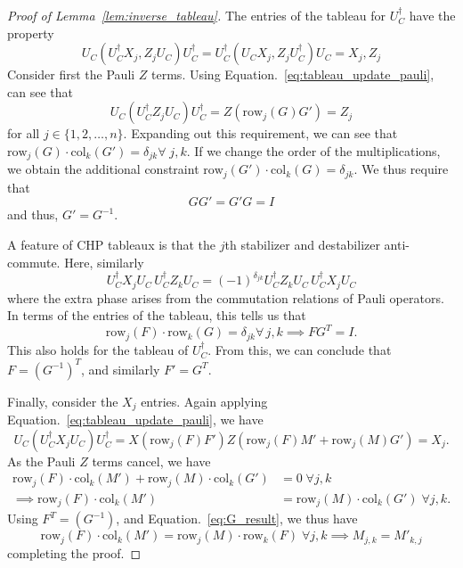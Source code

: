 \begin{proof}[Proof of Lemma~\ref{lem:inverse_tableau}]
The entries of the tableau for $U_{C}^{\dagger}$ have the property
\[
U_{C}\left(U_{C}^{\dagger}X_{j},Z_{j}U_{C}\right)U_{C}^{\dagger} = U_{C}^{\dagger}\left(U_{C}X_{j},Z_{j}U_{C}^{\dagger}\right)U_{C}=X_{j},Z_{j}
\]
Consider first the Pauli $Z$ terms. Using Equation.~\ref{eq:tableau_update_pauli}, can see that
\[U_{C}\left(U_{C}^{\dagger}Z_{j}U_{C}\right)U_{C}^{\dagger} = Z(\text{row}_{j}(G)G') = Z_{j}\]
for all $j\in\{1,2,\dots,n\}$. Expanding out this requirement, we can see that $\text{row}_{j}(G)\cdot \text{col}_{k}(G') = \delta_{jk}\forall\;j,k$. If we change the order of the multiplications, we obtain the additional constraint $\text{row}_{j}(G')\cdot \text{col}_{k}(G)=\delta_{jk}$. We thus require that
\begin{equation}
GG'=G'G=I
\label{eq:G_result}
\end{equation}
and thus, $G'=G^{-1}$.\par
A feature of CHP tableaux is that the $j$th stabilizer and destabilizer anti-commute. Here, similarly
\[U_{C}^{\dagger}X_{j}U_{C}\,U_{C}^{\dagger}Z_{k}U_{C}=\left(-1\right)^{\delta_{jk}}U_{C}^{\dagger}Z_{k}U_{C}\,U_{C}^{\dagger}X_{j}U_{C}\]
where the extra phase arises from the commutation relations of Pauli operators. In terms of the entries of the tableau, this tells us that
\[\text{row}_{j}(F)\cdot\text{row}_{k}(G)=\delta_{jk}\forall\,j,k\implies FG^{T}=I.\]
This also holds for the tableau of $U_{C}^{\dagger}$. From this, we can conclude that $F=\left(G^{-1}\right)^{T}$, and similarly $F'=G^{T}$.\par
Finally, consider the $X_{j}$ entries. Again applying Equation.~\ref{eq:tableau_update_pauli}, we have
\[U_{C}\left(U_{C}^{\dagger}X_{j}U_{C}\right)U_{C}^{\dagger}= X(\text{row}_{j}(F)F')Z(\text{row}_{j}(F)M' + \text{row}_{j}(M)G') = X_{j}.\]
As the Pauli $Z$ terms cancel, we have
\begin{align*}
\text{row}_{j}(F)\cdot\text{col}_{k}(M')+\text{row}_{j}(M)\cdot\text{col}_{k}(G')&=0\;\forall j,k\\
\implies \text{row}_{j}(F)\cdot\text{col}_{k}(M') &= \text{row}_{j}(M)\cdot\text{col}_{k}(G')\;\forall j,k.
\end{align*}
Using $F^{T}=(G^{-1})$, and Equation.~\ref{eq:G_result}, we thus have
\begin{equation}
\text{row}_{j}(F)\cdot\text{col}_{k}(M')=\text{row}_{j}(M)\cdot\text{row}_{k}(F)\;\forall j,k\implies M_{j,k}=M'_{k,j}
\end{equation}
completing the proof.
\end{proof}
